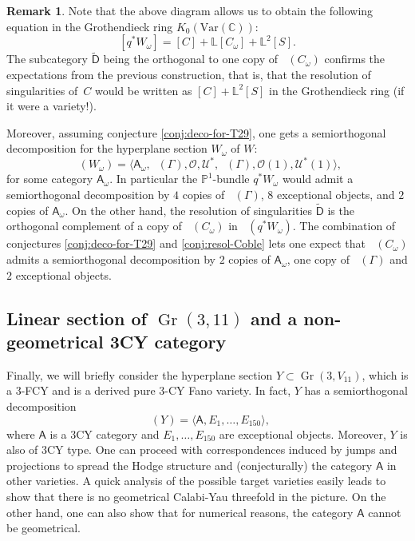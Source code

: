 \documentclass[JEP,XML,SOM,Unicode,NoEqCountersInSection]{cedram}
\newcommand{\Var}{\mathrm{Var}}
\let\mathcal\mathscr
\theoremstyle{plain}
\theoremstyle{definition}
\newtheorem{remark}[theorem]{Remark}
\newcommand{\cat}[1]{\mathsf{#1}}
\newcommand{\sod}[1]{\langle #1 \rangle}
\DeclareMathOperator{\Db}{{\cat{D}^{\mathrm{b}}}}
\DeclareMathOperator{\Gr}{Gr}
\newcommand{\CC}{\mathbb{C}}
\newcommand{\LL}{\mathbb{L}}
\newcommand{\PP}{\mathbb{P}}
\newcommand{\sheaf}[1]{\mathcal{#1}}
\newcommand{\ko}{\sheaf{O}}\let\OO\ko\let\cO\ko
\newcommand{\ku}{\sheaf{U}}
\begin{document}
\begin{remark}
Note that the above diagram allows us to obtain the following equation in the Grothendieck ring
$K_0(\Var(\CC))$:
\[
[q^* W_\omega] = [C] + \LL [C_\omega] + \LL^2 [S].
\]
The subcategory $\tilde{\cat{D}}$ being the orthogonal to one copy of $\Db(C_\omega)$ confirms
the expectations from the previous construction, that is, that the resolution of singularities of~$C$ would be written as $[C] + \LL^2 [S]$ in the Grothendieck ring (if it were a variety!).

Moreover, assuming conjecture \ref{conj:deco-for-T29}, one gets a semiorthogonal decomposition
for the hyperplane section $W_\omega$ of $W$:
\[
\Db(W_\omega) = \sod{\cat{A}_\omega,\Db(\Gamma),\ko,\ku^*,\Db(\Gamma),\ko(1),\ku^*(1)},
\]
for some category $\cat{A}_\omega$. In particular the $\PP^1$-bundle $q^* W_\omega$ would admit
a semiorthogonal decomposition by $4$ copies of $\Db(\Gamma)$, $8$ exceptional objects, and $2$ copies
of $\cat{A}_\omega$. On the other hand, the resolution of singularities $\tilde{\cat{D}}$ is the orthogonal
complement of a copy of $\Db(C_\omega)$ in $\Db(q^*W_\omega)$. The combination of conjectures
\ref{conj:deco-for-T29} and \ref{conj:resol-Coble} lets one expect that $\Db(C_\omega)$
admits a semiorthogonal decomposition by $2$ copies of $\cat{A}_\omega$, one copy of $\Db(\Gamma)$
and $2$ exceptional objects.
\end{remark}

\subsection{Linear section of $\Gr(3,11)$ and a non-geometrical 3CY category}
Finally, we will briefly consider the hyperplane section $Y \subset \Gr(3,V_{11})$, which is a 3-FCY and is a derived pure 3-CY Fano variety. In fact, $Y$ has a semiorthogonal
decomposition
\[
\Db(Y)= \sod{\cat{A},E_1,\ldots,E_{150}},
\]
where $\cat{A}$ is a 3CY category \cite{kuz-fractional} and $E_1,\ldots,E_{150}$ are
exceptional objects. Moreover, $Y$ is also of 3CY type. One can proceed with correspondences
induced by jumps and projections to spread the Hodge structure and (conjecturally) the category $\cat{A}$
in other varieties. A quick analysis of the possible target varieties easily leads to show that there is
no geometrical Calabi-Yau threefold in the picture. On the other hand, one can also show that
for numerical reasons, the category $\cat{A}$ cannot be geometrical.
\end{document}
